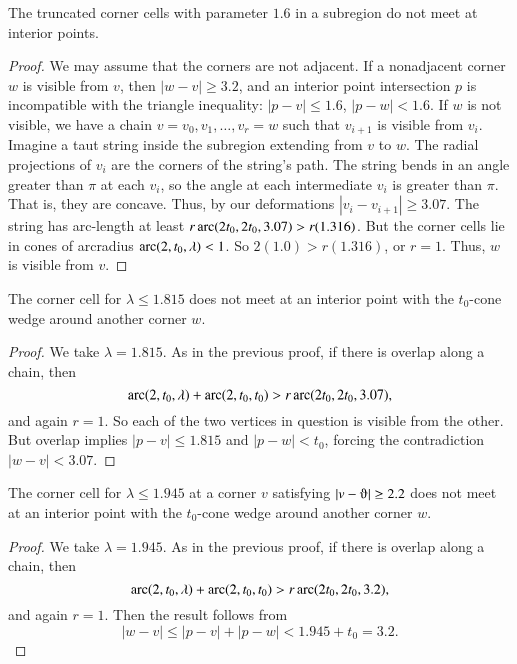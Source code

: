 \begin{lemma}
The truncated corner cells with parameter $1.6$ in a subregion do
not meet at interior points.
\end{lemma}

\begin{proof}
We may assume that the corners are not adjacent. If a nonadjacent
corner $w$ is visible from $v$, then $|w-v|\ge3.2$, and an
interior point intersection $p$ is incompatible with the triangle
inequality: $|p-v|\le 1.6$, $|p-w|<1.6$. If $w$ is not visible, we
have a chain $v=v_0,v_1,\ldots,v_r=w$ such that $v_{i+1}$ is
visible from $v_i$. Imagine a taut string inside the subregion
extending from $v$ to $w$. The radial projections of $v_i$ are the
corners of the string's path.   The string bends in an angle
greater than $\pi$ at each $v_i$, so the angle at each
intermediate $v_i$ is greater than $\pi$. That is, they are
concave. Thus, by our deformations $|v_i-v_{i+1}|\ge3.07$. The
string has arc-length at least $r \operatorname{arc}(2t_0,2t_0,3.07)>r (1.316)$.
But the corner cells lie in cones of arcradius
$\operatorname{arc}(2,t_0,\lambda)< 1$. So $2(1.0)>r(1.316)$, or $r=1$.  Thus,
$w$ is visible from $v$.
\end{proof}

\begin{lemma}
The corner cell for $\lambda \le 1.815$ does not meet at an
interior point with the $t_0$-cone wedge around another corner
$w$.
\end{lemma}

\begin{proof}
We take $\lambda=1.815$. As in the previous proof, if there is overlap
along a chain, then
    $$\operatorname{arc}(2,t_0,\lambda) +\operatorname{arc}(2,t_0,t_0) > r \operatorname{arc}(2t_0,2t_0,3.07),$$
and again $r=1$.  So each of the two vertices in question is visible
from the other. But overlap implies $|p-v|\le1.815$ and $|p-w|<t_0$,
forcing the contradiction $|w-v|<3.07$.
\end{proof}

\begin{lemma}
The corner cell for $\lambda \le 1.945$ at a corner $v$ satisfying
$|v-\orgn|\ge2.2$ does not meet at an interior point with the $t_0$-cone
wedge around another corner $w$.
\end{lemma}

\begin{proof}
We take $\lambda=1.945$. As in the previous proof, if there is overlap
along a chain, then
    $$\operatorname{arc}(2,t_0,\lambda) +\operatorname{arc}(2,t_0,t_0) > r \operatorname{arc}(2t_0,2t_0,3.2),$$
and again $r=1$.  Then the result follows from
    $$|w-v|\le |p-v|+|p-w| < 1.945 + t_0 = 3.2.$$
\end{proof}





